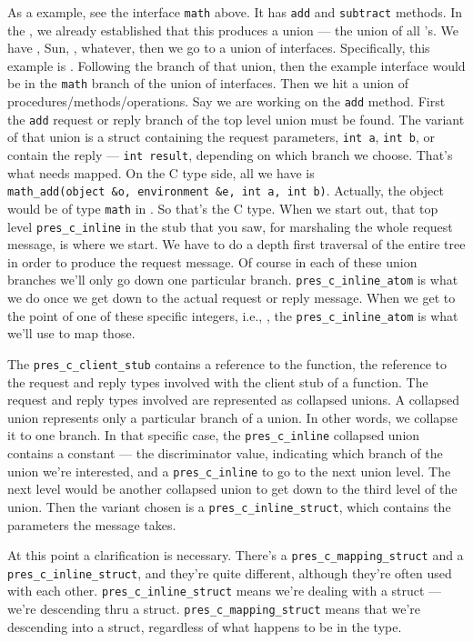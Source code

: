 As a example, see the interface \texttt{math} above.  It has \texttt{add} and
\texttt{subtract} methods.  In the \MINT{}, we already established that this
produces a \MINT{} union --- the union of all \IDL{}'s.  We have \CORBA{}, Sun, \MIG{},
whatever, then we go to a union of interfaces.  Specifically, this example is
\CORBA{}\@.  Following the \CORBA{} branch of that union, then the example interface
would be in the \texttt{math} branch of the union of interfaces.  Then we hit a
union of procedures/methods/operations.  Say we are working on the \texttt{add}
method.  First the \texttt{add} request or reply branch of the top level \CORBA{}
union must be found.  The variant of that union is a struct containing the
request parameters, \texttt{int~a}, \texttt{int~b}, or contain the reply ---
\texttt{int~result}, depending on which branch we choose.  That's what needs
mapped.  On the C type side, all we have is
\texttt{math\_add(object~\&o,~environment~\&e,~int~a,~int~b)}.  Actually, the
object would be of type \texttt{math} in \CORBA{}\@.  So that's the C type.  When
we start out, that top level \texttt{pres\_c\_inline} in the stub that you saw,
for marshaling the whole request message, is where we start.  We have to do a
depth first traversal of the entire \MINT{} tree in order to produce the request
message.  Of course in each of these union branches we'll only go down one
particular branch.  \texttt{pres\_c\_inline\_atom} is what we do once we get
down to the actual request or reply message.  When we get to the point of one
of these specific integers, i.e., , the
\texttt{pres\_c\_inline\_atom} is what we'll use to map those.

The \texttt{pres\_c\_client\_stub} contains a reference to the \CAST{} function,
the reference to the request and reply types involved with the client stub of a
function.  The request and reply types involved are represented as collapsed
unions.  A collapsed union represents only a particular branch of a union.  In
other words, we collapse it to one branch.  In that specific case, the
\texttt{pres\_c\_inline} collapsed union contains a \MINT{} constant --- the
discriminator value, indicating which branch of the union we're interested, and
a \texttt{pres\_c\_inline} to go to the next union level.  The next level would
be another collapsed union to get down to the third level of the union.  Then
the variant chosen is a \texttt{pres\_c\_inline\_struct}, which contains the
parameters the message takes.

At this point a clarification is necessary.  There's a
\texttt{pres\_c\_mapping\_struct} and a \texttt{pres\_c\_inline\_struct}, and
they're quite different, although they're often used with each other.
\texttt{pres\_c\_inline\_struct} means we're dealing with a \MINT{} struct ---
we're descending thru a \MINT{} struct.  \texttt{pres\_c\_mapping\_struct} means
that we're descending into a \CAST{} struct, regardless of what happens to be in
the \MINT{} type.

